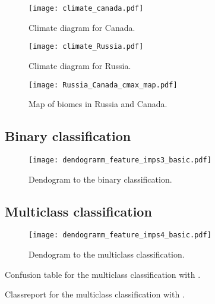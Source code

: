 \begin{figure}[h]
  \begin{minipage}{0.45\textwidth}
    \centering
    \texttt{[image: climate\_canada.pdf]}
    \caption{Climate diagram for Canada.}
    \label{fi:climate_canada}
  \end{minipage}
  \hfill
  \begin{minipage}{0.45\textwidth}
    \centering
    \texttt{[image: climate\_Russia.pdf]}
    \caption{Climate diagram for Russia.}
    \label{fi:climate_Russia}
  \end{minipage}
\end{figure}

\begin{figure}[h]
  \centering
  \texttt{[image: Russia\_Canada\_cmax\_map.pdf]}
  \caption{Map of biomes  in Russia and Canada.}
  \label{fi:}
\end{figure}

\clearpage

\subsection{Binary classification}

\begin{figure}[h]
  \centering
  \texttt{[image: dendogramm\_feature\_imps3\_basic.pdf]}
  \caption{Dendogram to the binary classification.}
  \label{pl:dendogramm_feature_imps3_basic}
\end{figure}

\clearpage
\subsection{Multiclass classification}
\begin{figure}[h]
  \centering
  \texttt{[image: dendogramm\_feature\_imps4\_basic.pdf]}
  \caption{Dendogram to the multiclass classification.}
  \label{pl:dendogramm_feature_imps3_basic}
\end{figure}


\begin{table}[h]
  \centering
  
  \caption{Confusion table for the multiclass classification with .}
  \label{tb:s4_basic_confTable}
\end{table}
\begin{table}[h]
  \centering
  
  \caption{Classreport for the multiclass classification with .}
  \label{tb:s4_basic_classreport}
\end{table}

